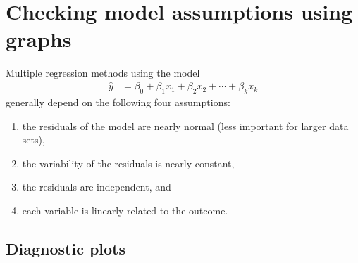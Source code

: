 





\section{Checking model assumptions using graphs}
\label{multipleRegressionModelAssumptions}


\noindent%
Multiple regression methods using the model
\begin{align*}
\hat{y} &= \beta_0 + \beta_1x_1 + \beta_2x_2 + \cdots + \beta_kx_k
\end{align*}
generally depend on the following four assumptions:
\begin{enumerate}
\setlength{\itemsep}{0mm}
\item the residuals of the model are nearly normal
    (less important for larger data sets),
\item the variability of the residuals is nearly constant,
\item the residuals are independent, and
\item each variable is linearly related to the outcome.
\end{enumerate}


\subsection{Diagnostic plots}
\label{diagnostic_plots_subsection}

